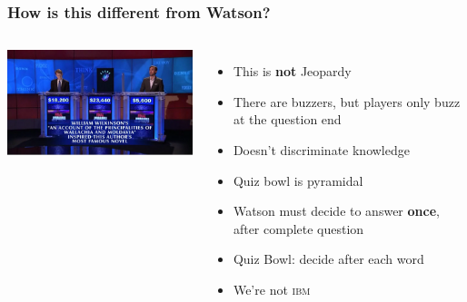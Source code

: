 \documentclass[compress]{beamer}
\begin{document}
\begin{frame}
	\frametitle{How is this different from Watson?}

	\begin{columns}

		\includegraphics[width=1.0\linewidth]{qb/jeopardy}


		\begin{itemize}
			\item This is {\bf not} Jeopardy \cite{ferruci-10}
			\item There are buzzers, but players only buzz
                          at the question end
			\item Doesn't discriminate knowledge
			\item Quiz bowl is pyramidal
                        \item Watson must decide to answer {\bf once}, after
                          complete question
                        \item Quiz Bowl: decide after each word
                        \pause
                        \item We're not \textsc{ibm}
		\end{itemize}

	\end{columns}

\end{frame}
\end{document}
